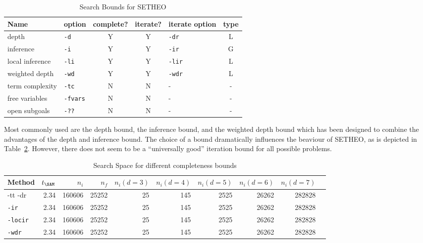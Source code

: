 \begin{table}[htb]
\begin{center}
\small
\begin{tabular}{|l|l|c|c|l|c|}
\hline
Name & option & complete? & iterate? & iterate option & type \\
\hline\hline
depth & {\tt -d} & Y & Y & {\tt -dr} & L \\
inference & {\tt -i} & Y & Y & {\tt -ir} & G \\
local inference & {\tt -li} & Y & Y & {\tt -lir} & L \\
weighted depth & {\tt -wd} & Y & Y & {\tt -wdr} & L \\
\hline
term complexity & {\tt -tc} & N & N & - & - \\
free variables & {\tt -fvars} & N & N & - & - \\
open subgoals & {\tt -??} & N & N & - & - \\
\hline
\end{tabular}
\end{center}
\caption{Search Bounds for SETHEO}
\label{tab:tut2:bounds:list}
\end{table}

Most commonly used are the depth bound, the inference bound, and the
weighted depth bound which has been designed to combine the advantages
of the depth and inference bound. The choice of a bound dramatically
influences the beaviour of SETHEO, as is depicted in
Table~\ref{tab:tut2:bounds.results}. However, there does not seem
to be a ``universally good'' iteration bound for all possible problems.

\begin{table}[htb]
\begin{center}
\begin{tabular}{|l|r|r||r|r||r|r|r|r|r|}
\hline
Method & $t_{\SAM}$ & $n_i$ & $n_f$ & 
	$n_i (d=3)$ & $n_i (d=4)$ & $n_i (d=5)$ & $n_i (d=6)$ & $n_i (d=7)$ \\
\hline\hline
{-tt -dr} & 2.34 & 160606 & 25252 &
	25 & 145 & 2525 & 26262 & 282828 \\
\hline
{\tt -ir} & 2.34 & 160606 & 25252 &
	25 & 145 & 2525 & 26262 & 282828 \\
\hline
{\tt -locir} & 2.34 & 160606 & 25252 &
	25 & 145 & 2525 & 26262 & 282828 \\
\hline
{\tt -wdr} & 2.34 & 160606 & 25252 &
	25 & 145 & 2525 & 26262 & 282828 \\
\hline\hline
\end{tabular}
\end{center}
\caption{Search Space for different completeness bounds}
\label{tab:tut2:bounds.results}
\end{table}

